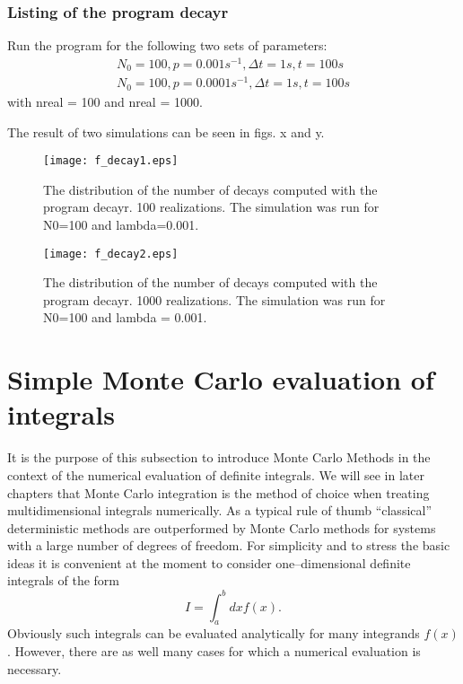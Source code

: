 \subsubsection{Listing of the program decayr}


Run the program for the following two sets of parameters:
\begin{eqnarray*}
N_0= 100, p = 0.001 s^{-1}, \Delta t = 1s, t = 100s \\
N_0= 100, p = 0.0001 s^{-1}, \Delta t = 1s, t = 100s
\end{eqnarray*}
with nreal = 100 and nreal = 1000.

The result of  two simulations can be seen in figs. x and y.
\begin{figure}
\texttt{[image: f\_decay1.eps]}
\caption{The distribution of the number of decays computed with 
the program decayr. 100 realizations. The simulation was run for
N0=100 and lambda=0.001.}
\end{figure}

\begin{figure}
\texttt{[image: f\_decay2.eps]}
\caption{The distribution of the number of decays computed with 
the program decayr. 1000 realizations. The simulation was run
for N0=100 and lambda = 0.001.}
\end{figure}

\section{Simple Monte Carlo evaluation of integrals}
It is the purpose of this subsection to introduce Monte Carlo Methods
in the context of the numerical evaluation of definite integrals.
We will see in later chapters that Monte Carlo integration is the
method of choice when treating multidimensional
integrals numerically. As a typical rule of thumb
``classical'' deterministic methods are outperformed
by Monte Carlo methods  for systems with a large number of 
degrees of freedom.
For simplicity and to stress the basic ideas 
it is convenient at the moment to consider one--dimensional definite
integrals of the form
\begin{equation}
\label{INTEGRAL}
I = \int_a^b dx f(x).
\end{equation}
Obviously such integrals can be evaluated analytically for many
integrands
$f(x)$.  However, there are as well many cases for which a numerical
evaluation is necessary.

